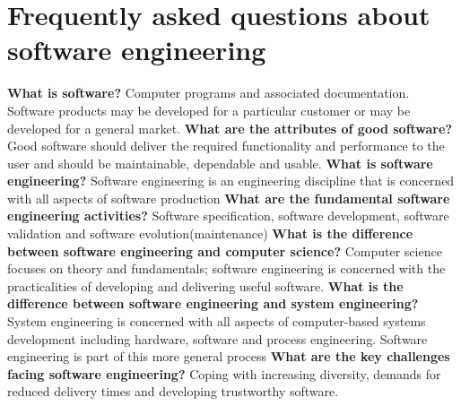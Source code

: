 \documentclass{article}
\begin{document}
\newpage
\section{Frequently asked questions about software engineering}
\vspace{-8pt}
\textbf{What is software?}\newline
  Computer programs and associated documentation. Software products may be developed for a particular customer or may be developed for a general market.
\newline\newline
\textbf{What are the attributes of good software?}\newline
  Good software should deliver the required functionality and performance to the user and should be maintainable, dependable and usable.
\newline\newline
\textbf{What is software engineering?}\newline
Software engineering is an engineering discipline that is
concerned with all aspects of software production
\newline\newline
\textbf{What are the fundamental software engineering activities?}\newline
Software specification, software development, software
validation and software evolution(maintenance)
\newline\newline
\textbf{What is the difference between software engineering and computer science?}\newline
Computer science focuses on theory and fundamentals; software engineering is concerned with the practicalities of developing and delivering useful software.
\newline\newline
\textbf{What is the difference between software engineering and system engineering?}\newline
System engineering is concerned with all aspects of computer-based systems development including hardware, software and process engineering. Software engineering is part of this more general process
\newline\newline
\textbf{What are the key challenges facing software engineering?}\newline
Coping with increasing diversity, demands for reduced delivery times and developing trustworthy software.
\newline\newline
\end{document}
